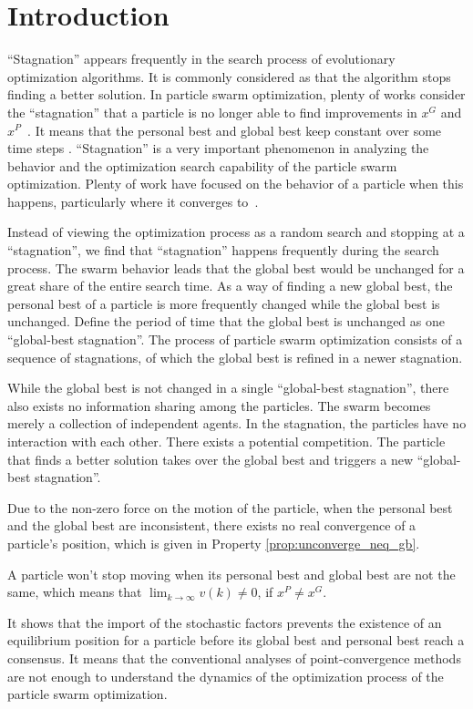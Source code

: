 \section{Introduction}
\label{sec:introduction}

``Stagnation'' appears frequently in the search process of evolutionary optimization algorithms. 
It is commonly considered as that the algorithm stops finding a better solution.
In particle swarm optimization,
plenty of works consider the ``stagnation'' that a particle is no longer able to find improvements in $ x^{G} $ and $ x^{P} $~\cite{Clerc06stagnationanalysis}.
It means that the personal best and global best keep constant over some time steps \cite{4223160}.
``Stagnation'' is a very important phenomenon in analyzing the behavior and the optimization search capability of the particle swarm optimization.
Plenty of work have focused on the behavior of a particle when this happens, particularly where it converges to~\cite{Schmitt:2013:PSO:2463372.2463563}\cite{Poli:2008:DSS:1384929.1384944}.

Instead of viewing the optimization process as a random search and stopping at a ``stagnation'', we find that ``stagnation'' happens frequently during the search process.
The swarm behavior leads that the global best would be unchanged for a great share of the entire search time.
As a way of finding a new global best, the personal best of a particle is more frequently changed while the global best is unchanged. 
Define the period of time that the global best is unchanged as one ``global-best stagnation''.
The process of particle swarm optimization consists of a sequence of stagnations, of which the global best is refined in a newer stagnation.

While the global best is not changed in a single ``global-best stagnation'', there also exists no information sharing among the particles.
The swarm becomes merely a collection of independent agents.
In the stagnation, the particles have no interaction with each other.
There exists a potential competition.
The particle that finds a better solution takes over the global best and triggers a new ``global-best stagnation''.

Due to the non-zero force on the motion of the particle, when the personal best and the global best are inconsistent, there exists no real convergence of a particle's position, which is given in Property \ref{prop:unconverge_neq_gb}.
\begin{myprop}
\label{prop:unconverge_neq_gb}
A particle won't stop moving when its personal best and global best are not the same, 
which means that 
$ \lim_{k \rightarrow \infty} v(k) \neq 0 $, if $ x^{P} \neq x^{G} $.
\end{myprop}
It shows that the import of the stochastic factors prevents the existence of an equilibrium position for a particle before its global best and personal best reach a consensus.
It means that the conventional analyses of point-convergence methods are not enough to understand the dynamics of the optimization process of the particle swarm optimization.  